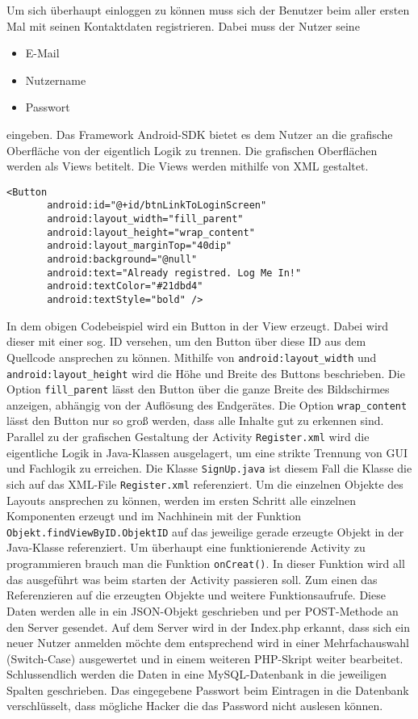 Um sich überhaupt einloggen zu können muss sich der Benutzer beim aller ersten Mal  mit seinen Kontaktdaten registrieren. Dabei muss der Nutzer seine 
\begin{itemize}
	\item{E-Mail}
	\item{Nutzername}
	\item{Passwort}
\end{itemize}
eingeben.
Das Framework Android-SDK bietet es dem Nutzer an die grafische Oberfläche von der eigentlich Logik zu trennen. Die grafischen Oberflächen werden als Views betitelt. Die Views werden mithilfe von XML gestaltet.
\begin{lstlisting}[caption={Android - Button erstellen},captionpos=b]
<Button
       android:id="@+id/btnLinkToLoginScreen"
       android:layout_width="fill_parent"
       android:layout_height="wrap_content"
       android:layout_marginTop="40dip"
       android:background="@null"
       android:text="Already registred. Log Me In!"
       android:textColor="#21dbd4"
       android:textStyle="bold" />
\end{lstlisting}
In dem obigen Codebeispiel wird ein Button in der View erzeugt. Dabei wird dieser mit einer sog. ID versehen, um den Button über diese ID aus dem Quellcode ansprechen zu können. Mithilfe von \texttt{android:layout\_width} und \texttt{android:layout\_height} wird die Höhe und Breite des Buttons beschrieben. Die Option \texttt{fill\_parent} lässt den Button über die ganze Breite des Bildschirmes anzeigen, abhängig von der Auflösung des Endgerätes. Die Option \texttt{wrap\_content} lässt den Button nur so groß werden, dass alle Inhalte gut zu erkennen sind.
\\
Parallel zu der grafischen Gestaltung der Activity \texttt{Register.xml} wird die eigentliche Logik in Java-Klassen ausgelagert, um eine strikte Trennung von GUI und Fachlogik zu erreichen. Die Klasse \texttt{SignUp.java} ist diesem Fall die Klasse die sich auf das XML-File \texttt{Register.xml} referenziert. Um die einzelnen Objekte des Layouts ansprechen zu können, werden im ersten Schritt alle einzelnen Komponenten erzeugt und im Nachhinein mit der Funktion \texttt{Objekt.findViewByID.ObjektID} auf das jeweilige gerade erzeugte Objekt in der Java-Klasse referenziert.
Um überhaupt eine funktionierende Activity zu programmieren brauch man die Funktion \texttt{onCreat()}. In dieser Funktion wird all das ausgeführt was beim starten der Activity passieren soll. Zum einen das Referenzieren auf die erzeugten Objekte und weitere Funktionsaufrufe.
Diese Daten werden alle in ein JSON-Objekt geschrieben und per POST-Methode an den Server gesendet. Auf dem Server wird in der Index.php erkannt, dass sich ein neuer Nutzer anmelden möchte dem entsprechend wird in einer Mehrfachauswahl (Switch-Case) ausgewertet und in einem weiteren PHP-Skript weiter bearbeitet. Schlussendlich werden die Daten in eine MySQL-Datenbank in die jeweiligen Spalten geschrieben. Das eingegebene Passwort beim Eintragen in die Datenbank verschlüsselt, dass mögliche Hacker die das Password nicht auslesen können. 
